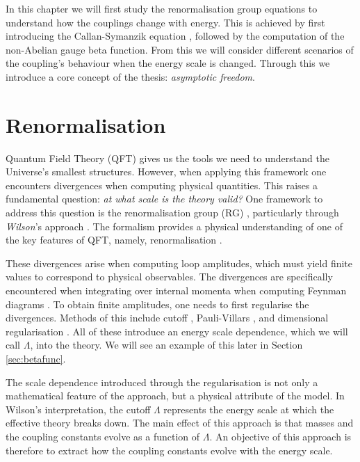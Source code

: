 In this chapter we will first study the renormalisation group equations to understand how the couplings change with energy. This is achieved by first introducing the Callan-Symanzik equation \cite{Callan:1970yg, Symanzik:1970rt, Symanzik:1971vw}, followed by the computation of the non-Abelian gauge beta function. From this we will consider different scenarios of the coupling's behaviour when the energy scale is changed. Through this we introduce a core concept of the thesis: \textit{asymptotic freedom}.

\section{Renormalisation}
Quantum Field Theory (QFT) gives us the tools we need to understand the Universe's smallest structures. However, when applying this framework one encounters divergences when computing physical quantities. This raises a fundamental question: \textit{at what scale is the theory valid?} One framework to address this question is the renormalisation group (RG) \cite{Gell-Mann:1954yli}, particularly through \textit{Wilson}'s approach \cite{Wilson:1983xri, Wilson:1974mb}. The formalism provides a physical understanding of one of the key features of QFT, namely, renormalisation \cite{Pernow:2021fvb}.

These divergences arise when computing loop amplitudes, which must yield finite values to correspond to physical observables. The divergences are specifically encountered when integrating over internal momenta when computing Feynman diagrams \cite{Pernow:2021fvb}. To obtain finite amplitudes, one needs to first regularise the divergences. Methods of this include cutoff \cite{Peskin:1995ev}, Pauli-Villars \cite{Pauli:1949zm}, and dimensional regularisation \cite{tHooft:1972tcz}. All of these introduce an energy scale dependence, which we will call $\Lambda$, into the theory. We will see an example of this later in Section \ref{sec:betafunc}. 

The scale dependence introduced through the regularisation is not only a mathematical feature of the approach, but a physical attribute of the model. In Wilson's interpretation, the cutoff $\Lambda$ represents the energy scale at which the effective theory breaks down. The main effect of this approach is that masses and the coupling constants evolve as a function of $\Lambda$. An objective of this approach is therefore to extract how the coupling constants evolve with the energy scale. 

